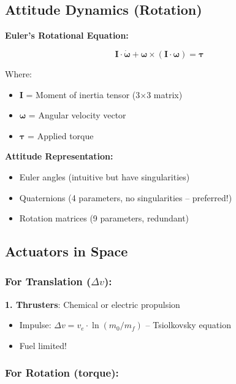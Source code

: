 \documentclass[11pt,a4paper]{article}
\begin{document}
\subsection{Attitude Dynamics (Rotation)}

\textbf{Euler's Rotational Equation:}

\begin{equation}
\mathbf{I} \cdot \dot{\boldsymbol{\omega}} + \boldsymbol{\omega} \times (\mathbf{I} \cdot \boldsymbol{\omega}) = \boldsymbol{\tau}
\end{equation}

Where:
\begin{itemize}[leftmargin=*]
    \item $\mathbf{I}$ = Moment of inertia tensor (3$\times$3 matrix)
    \item $\boldsymbol{\omega}$ = Angular velocity vector
    \item $\boldsymbol{\tau}$ = Applied torque
\end{itemize}

\textbf{Attitude Representation:}
\begin{itemize}[leftmargin=*]
    \item Euler angles (intuitive but have singularities)
    \item Quaternions (4 parameters, no singularities -- preferred!)
    \item Rotation matrices (9 parameters, redundant)
\end{itemize}

\subsection{Actuators in Space}

\subsubsection{For Translation ($\Delta v$):}

\textbf{1. Thrusters}: Chemical or electric propulsion
\begin{itemize}[leftmargin=*]
    \item Impulse: $\Delta v = v_e \cdot \ln(m_0/m_f)$ -- Tsiolkovsky equation
    \item Fuel limited!
\end{itemize}

\subsubsection{For Rotation (torque):}
\end{document}
